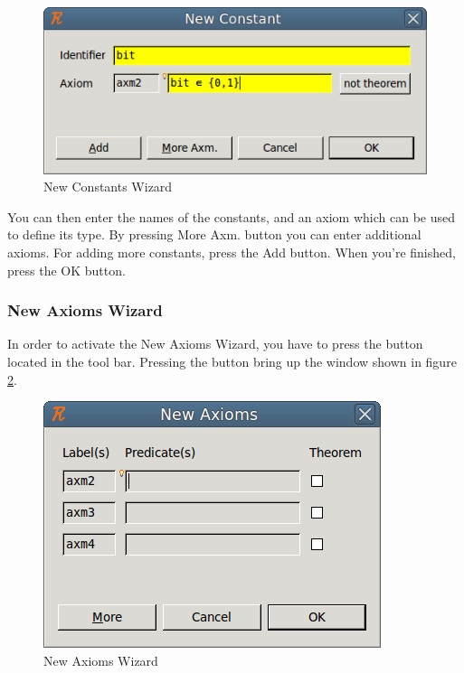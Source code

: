 \begin{figure}[!h]
\begin{center}
	\includegraphics{img/reference/ref_01_eventb_editor6.png}
	\caption{New Constants Wizard}
	\label{fig_ref_01_eventb_editor6}
\end{center}
\end{figure}

You can then enter the names of the constants, and an axiom which can be used to define its type. By pressing \textsf{More Axm.} button you can enter additional axioms. For adding more constants, press the \textsf{Add} button. When you’re finished, press the \textsf{OK} button.

\subsubsection{New Axioms Wizard}

In order to activate the \textsf{New Axioms Wizard}, you have to press the  button located in the tool bar. Pressing the button bring up the window shown in figure \ref{fig_ref_01_eventb_editor7}.

\begin{figure}[!h]
\begin{center}
	\includegraphics{img/reference/ref_01_eventb_editor7.png}
	\caption{New Axioms Wizard}
	\label{fig_ref_01_eventb_editor7}
\end{center}
\end{figure}


